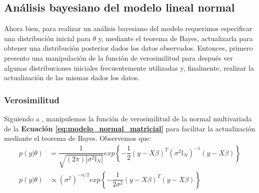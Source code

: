 \subsection{Análisis bayesiano del modelo lineal normal}

Ahora bien, para realizar un análisis bayesiano del modelo requerimos especificar una distribución inicial para $\theta$ y, mediante el teorema de Bayes, actualizarla para obtener una distribución posterior dados los datos observados. Entonces, primero presento una manipulación de la función de verosimilitud para después ver algunas distribuciones iniciales frecuentemente utilizadas y, finalmente, realizar la actualización de las mismas dados los datos. 

\subsubsection*{Verosimilitud}

Siguiendo a \textcites[Cap. 3]{GP98}[Sec. 4.2 ]{Congdon06}, manipulemos la función de verosimilitud de la normal multivariada de la \textbf{Ecuación \ref{eq:modelo_normal_matricial}} para facilitar la actualización mediante el teorema de Bayes. Observemos que:
\begin{align}\label{eq:modelo_normal_prop}
p(y|\theta) &= \dfrac{1}{\sqrt{(2\pi)|\sigma^2 \mathbb{I}_N|}}exp\left\lbrace -\dfrac{1}{2}(y-X\beta)^T(\sigma^2\mathbb{I}_N)^{-1}(y-X\beta)\right\rbrace \nonumber \\
p(y|\theta) &\propto (\sigma^2)^{-n/2}exp\left\lbrace -\dfrac{1}{2\sigma^2}(y-X\beta)^T(y-X\beta)\right\rbrace
\end{align}

